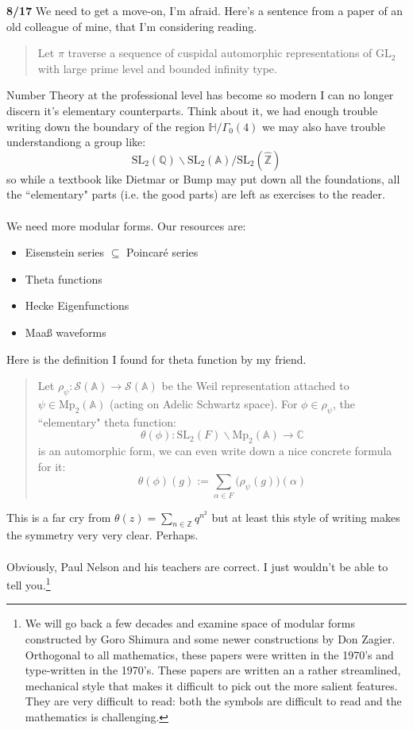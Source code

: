 \documentclass[12pt]{article}
\begin{document}
\noindent \textbf{8/17}  We need to get a move-on, I'm afraid.  Here's a sentence from a paper of an old colleague of mine, that I'm considering reading.
\begin{quotation} \noindent Let $\pi$ traverse a sequence of cuspidal automorphic representations of $\text{GL}_2$ with large prime level and bounded infinity type.
\end{quotation}
Number Theory at the professional level has become so modern I can no longer discern it's elementary counterparts.  Think about it, we had enough trouble writing down the boundary of the region $\mathbb{H}/\Gamma_0(4)$ we may also have trouble understandiong a group like:
$$ \text{SL}_2(\mathbb{Q})\backslash \text{SL}_2(\mathbb{A})/\text{SL}_2(\hat{\mathbb{Z}})$$
so while a textbook like Dietmar or Bump may put down all the foundations, all the ``elementary" parts (i.e. the good parts)  are left as exercises to the reader. \\ \\
We need more modular forms.  Our resources are:
\begin{itemize}
\item Eisenstein series $\subseteq$ Poincar\'{e} series
\item Theta functions
\item Hecke Eigenfunctions
\item Maa{\ss} waveforms 
\end{itemize}
Here is the definition I found for theta function by my friend.
\begin{quotation}
Let $\rho_\psi: \mathcal{S}(\mathbb{A})\to \mathcal{S}(\mathbb{A})$ be the Weil representation attached to $\psi\in \text{Mp}_2(\mathbb{A})$ (acting on Adelic Schwartz space).  For $\phi \in \rho_\psi$, the ``elementary" theta function:
$$ \theta(\phi): \text{SL}_2(F)\backslash \text{Mp}_2(\mathbb{A}) \to \mathbb{C} $$
is an automorphic form, we can even write down a nice concrete formula for it:
$$\theta(\phi)(g) := \sum_{\alpha \in F} \Big(\rho_\psi(g)\Big)(\alpha) $$
\end{quotation}
This is a far cry from $\theta(z) = \sum_{n \in \mathbb{Z}} q^{n^2}$ but at least this style of writing makes the symmetry very very clear.  Perhaps. \\ \\
Obviously, Paul Nelson and his teachers are correct.  I just wouldn't be able to tell you.\footnote{We will go back a few decades and examine space of modular forms constructed by Goro Shimura and some newer constructions by Don Zagier. Orthogonal to all mathematics, these papers were written in the 1970's and type-written in the 1970's.  These papers are written an a rather streamlined, mechanical style that makes it difficult to pick out the more salient features. They are very difficult to read: both the symbols are difficult to read and the mathematics is challenging.}   
\end{document}
